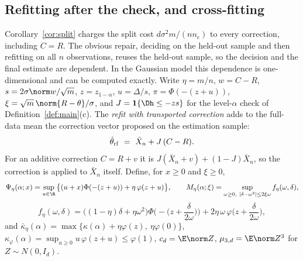 
\subsection*{Refitting after the check, and cross-fitting}

Corollary~\ref{cor:split} charges the split cost $d\sigma^2m/(nn_e)$ to every correction, including $C=R$. The obvious repair, deciding on the held-out sample and then refitting on all $n$ observations, reuses the held-out sample, so the decision and the final estimate are dependent. In the Gaussian model this dependence is one-dimensional and can be computed exactly. Write $\eta=m/n$, $w=C-R$, $s=2\sigma\norm w/\sqrt m$, $z=z_{1-\alpha}$, $u=\Delta/s$, $\pi=\Phi(-(z+u))$, $\xi=\sqrt m\,\norm{R-\theta}/\sigma$, and $J=\mathbf 1\{\Dh\le-zs\}$ for the level-$\alpha$ check of Definition~\ref{def:main}(c). The \emph{refit with transported correction} adds to the full-data mean the correction vector proposed on the estimation sample:
\[
\hat\theta_{\rm rf}\ =\ \bar X_n+J\,(C-R).
\]
For an additive correction $C=R+v$ it is $J(\bar X_n+v)+(1-J)\bar X_n$, so the correction is applied to $\bar X_n$ itself. Define, for $x\ge0$ and $\xi\ge0$,
\[
\Psi_\eta(\alpha;x)=\sup_{u\in\R}\big\{(u+x)\Phi(-(z+u))+\eta\,\varphi(z+u)\big\},\qquad
M_\eta(\alpha;\xi)=\sup_{\omega\ge0,\ |\delta-\omega^2|\le2\xi\omega} f_\eta(\omega,\delta),
\]
\[
f_\eta(\omega,\delta)=\big((1-\eta)\delta+\eta\omega^2\big)\Phi\Big(-\Big(z+\frac{\delta}{2\omega}\Big)\Big)+2\eta\,\omega\,\varphi\Big(z+\frac{\delta}{2\omega}\Big),
\]
and $\bar\kappa_\eta(\alpha)=\max\{\kappa(\alpha)+\eta\varphi(z),\ \eta\varphi(0)\}$, $\kappa_\varphi(\alpha)=\sup_{u\ge0}u\,\varphi(z+u)\le\varphi(1)$, $c_d=\E\norm Z$, $\mu_{3,d}=\E\norm Z^3$ for $Z\sim N(0,I_d)$.

